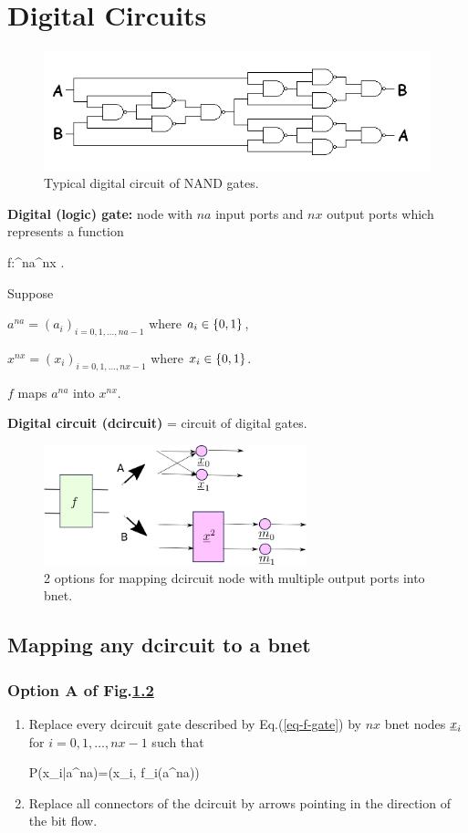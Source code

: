 \chapter{Digital Circuits}

\begin{figure}[h!]
\centering
\includegraphics[width=6in]{d-ckt/d-ckt.png}
\caption{Typical digital circuit
of NAND gates.}
\label{fig-d-ckt}
\end{figure}

{\bf Digital (logic) gate:} node with
$na$ input ports and $nx$ output ports
which represents a function

\beq
f:\bool^{na}\rarrow \bool^{nx}
\;.
\label{eq-f-gate}
\eeq

Suppose

$a^{na}=(a_i)_{i=0, 1,\dots, na-1}$ 
where $a_i\in \{0,1\}$,

$x^{nx}=(x_i)_{i=0, 1,\dots, nx-1}$ 
where $x_i\in \{0,1\}$. 

$f$ maps $a^{na}$ into $x^{nx}$.

{\bf Digital circuit (dcircuit)} = circuit of digital gates.

\begin{figure}[h!]
\centering
\includegraphics[width=3in]{d-ckt/d-ckt-2ops.png}
\caption{2 options
for mapping dcircuit node with
multiple output ports into bnet.}
\label{fig-d-ckt-2ops}
\end{figure}

\section{Mapping any
dcircuit to a bnet} 
\subsection{Option A of Fig.\ref{fig-d-ckt-2ops}}
\begin{enumerate}
\item
Replace every dcircuit  gate 
described by Eq.(\ref{eq-f-gate})
by
$nx$ bnet nodes $\rvx_i$
for $i=0, 1, \ldots, nx-1$
such that

\beq\color{blue}
P(x_i|a^{na})=\delta(x_i, f_i(a^{na}))
\eeq
\item
Replace
all connectors of the dcircuit
by arrows 
pointing in the direction
of the bit flow.

\end{enumerate}

